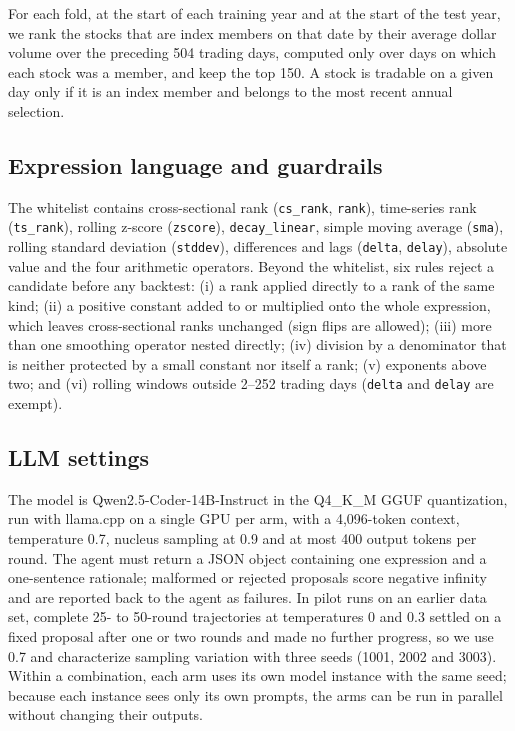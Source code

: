 \documentclass[preprint,12pt,authoryear]{elsarticle}
\begin{document}
For each fold, at the start of each training year and at the start of the test year, we rank the stocks that are index members on that date by their average dollar volume over the preceding 504 trading days, computed only over days on which each stock was a member, and keep the top 150. A stock is tradable on a given day only if it is an index member and belongs to the most recent annual selection.

\subsection{Expression language and guardrails}\label{app:guardrails}

The whitelist contains cross-sectional rank (\texttt{cs\_rank}, \texttt{rank}), time-series rank (\texttt{ts\_rank}), rolling z-score (\texttt{zscore}), \texttt{decay\_linear}, simple moving average (\texttt{sma}), rolling standard deviation (\texttt{stddev}), differences and lags (\texttt{delta}, \texttt{delay}), absolute value and the four arithmetic operators. Beyond the whitelist, six rules reject a candidate before any backtest: (i) a rank applied directly to a rank of the same kind; (ii) a positive constant added to or multiplied onto the whole expression, which leaves cross-sectional ranks unchanged (sign flips are allowed); (iii) more than one smoothing operator nested directly; (iv) division by a denominator that is neither protected by a small constant nor itself a rank; (v) exponents above two; and (vi) rolling windows outside 2--252 trading days (\texttt{delta} and \texttt{delay} are exempt).

\subsection{LLM settings}\label{app:llm}

The model is Qwen2.5-Coder-14B-Instruct in the Q4\_K\_M GGUF quantization, run with llama.cpp on a single GPU per arm, with a 4,096-token context, temperature 0.7, nucleus sampling at 0.9 and at most 400 output tokens per round. The agent must return a JSON object containing one expression and a one-sentence rationale; malformed or rejected proposals score negative infinity and are reported back to the agent as failures. In pilot runs on an earlier data set, complete 25- to 50-round trajectories at temperatures 0 and 0.3 settled on a fixed proposal after one or two rounds and made no further progress, so we use 0.7 and characterize sampling variation with three seeds (1001, 2002 and 3003). Within a combination, each arm uses its own model instance with the same seed; because each instance sees only its own prompts, the arms can be run in parallel without changing their outputs.
\end{document}
